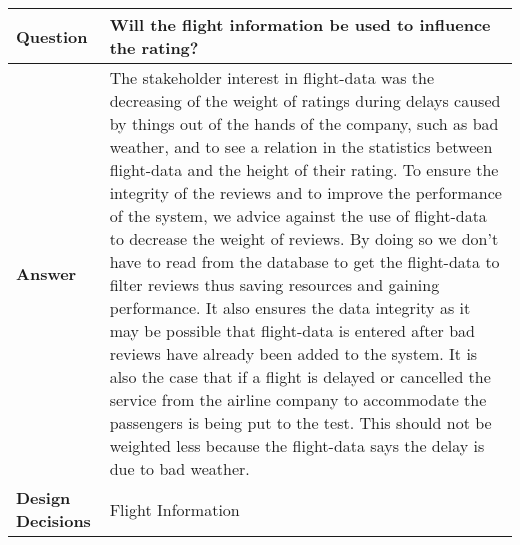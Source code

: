 \begin{longtable}{| l |  p{12cm} |}
\hline
\textbf{Question} & \textbf{Will the flight information be used to influence the rating?}  \\ \hline
\textbf{Answer} & The stakeholder interest in flight-data was the decreasing of the weight of ratings during delays caused by things out of the hands of the company, such as bad weather, and to see a relation in the statistics between flight-data and the height of their rating. To ensure the integrity of the reviews and to improve the performance of the system, we advice against the use of flight-data to decrease the weight of reviews. By doing so we don't have to read from the database to get the flight-data to filter reviews thus saving resources and gaining performance. It also ensures the data integrity as it may be possible that flight-data is entered after bad reviews have already been added to the system. It is also the case that if a flight is delayed or cancelled the service from the airline company to accommodate the passengers is being put to the test. This should not be weighted less because the flight-data says the delay is due to bad weather.
  \\ \hline
\textbf{Design Decisions} & Flight Information \\ \hline
\end{longtable}
